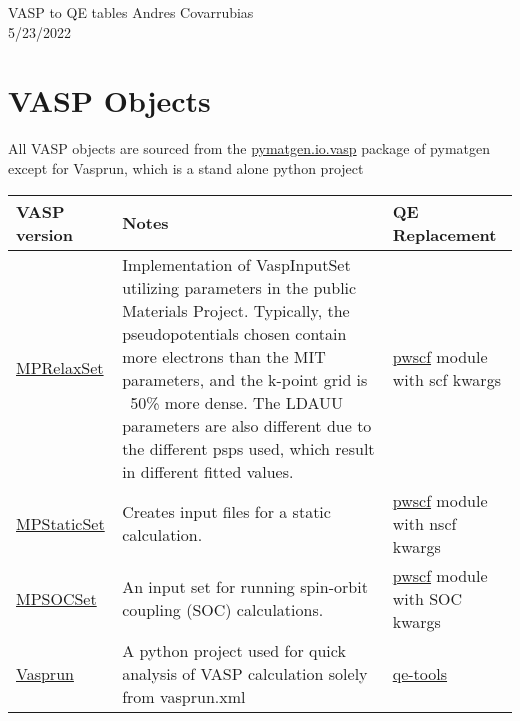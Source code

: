 \documentclass[12pt]{article}
\begin{document}
\noindent VASP to QE tables \hfill Andres Covarrubias    \\
5/23/2022

\hrulefill
\section*{VASP Objects}
All VASP objects are sourced from the \href{https://pymatgen.org/pymatgen.io.vasp.html?highlight=io\%20vasp\#module-pymatgen.io.vasp}{pymatgen.io.vasp} package of pymatgen except for Vasprun, which is a stand alone python project
\begin{center}
\begin{table}[ht]
\begin{tabularx}{\linewidth}{|>{\RaggedRight}p{2.5cm}|x|x|}\hline
 VASP version & Notes & QE Replacement \\ \hline
 
 \href{https://pymatgen.org/pymatgen.io.vasp.sets.html?highlight=mprelaxset#pymatgen.io.vasp.sets.MPRelaxSet}{MPRelaxSet} & 
 Implementation of VaspInputSet utilizing parameters in the public Materials Project. Typically, the pseudopotentials chosen contain more electrons than the MIT parameters, and the k-point grid is ~50\% more dense. The LDAUU parameters are also different due to the different psps used, which result in different fitted values. & 
\href{https://pymatgen.org/pymatgen.io.pwscf.html?highlight=pwscf}{pwscf} module with scf kwargs\\ \hline
 
 \href{https://pymatgen.org/pymatgen.io.vasp.sets.html?highlight=mpstaticset#pymatgen.io.vasp.sets.MPStaticSet}{MPStaticSet} &
Creates input files for a static calculation. &
\href{https://pymatgen.org/pymatgen.io.pwscf.html?highlight=pwscf}{pwscf} module with nscf kwargs \\ \hline
 
 \href{https://pymatgen.org/pymatgen.io.vasp.sets.html?highlight=mpsocset#pymatgen.io.vasp.sets.MPSOCSet}{MPSOCSet} &
 An input set for running spin-orbit coupling (SOC) calculations. &
\href{https://pymatgen.org/pymatgen.io.pwscf.html?highlight=pwscf}{pwscf} module with SOC kwargs \\ \hline
 
 \href{https://vasprun-xml.readthedocs.io/en/latest/}{Vasprun} &
 A python project used for quick analysis of VASP calculation solely from vasprun.xml &
 \href{https://github.com/maxhutch/qe-tools/blob/master/README.md}{qe-tools} \\ \hline
\end{tabularx}
\end{table}
\end{center}
\end{document}

